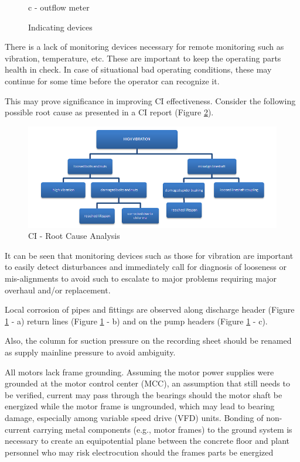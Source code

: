 \begin{figure} [!htb]
\begin{minipage}[b]{0.3\linewidth}
		\caption*{c - outflow meter}
		\label{ch043_flowmeter2}
	\end{minipage}
\caption{Indicating devices }
\label{plant_meters}
\end{figure}

There is a lack of monitoring devices necessary for remote monitoring such as vibration, temperature, etc. These are important to keep the operating parts health in check. In case of situational bad operating conditions, these may continue for some time before the operator can recognize it. 

This may prove significance in improving CI effectiveness. Consider the following possible root cause as presented in a CI report (Figure \ref{ch043_sample_root_cause_analysis}).

\begin{figure} [!htb]
	\includegraphics[scale=.7]{figures/fig_ch043_sample_root_cause_analysis} 
	\caption{CI - Root Cause Analysis}
	\label{ch043_sample_root_cause_analysis}
\end{figure}

It can be seen that monitoring devices such as those for vibration are important to easily detect disturbances and immediately call for diagnosis of looseness or mis-alignments to avoid such to escalate to major problems requiring major overhaul and/or replacement.

Local corrosion of pipes and fittings are observed along discharge header (Figure \ref{plant_meters} - a) return lines (Figure \ref{plant_meters} - b) and on the pump headers (Figure \ref{plant_meters} - c).



Also, the column for suction pressure on the recording sheet should be renamed as supply mainline pressure to avoid ambiguity.

All motors lack frame grounding. Assuming the motor power supplies were grounded at the motor control center (MCC), an assumption that still needs to be verified, current may pass through the bearings should the motor shaft be energized while the motor frame is ungrounded, which may lead to bearing damage, especially among variable speed drive (VFD) units. Bonding of non-current carrying metal components (e.g., motor frames) to the ground system is necessary to create an equipotential plane between the concrete floor and plant personnel who may risk electrocution should the frames parts be energized

